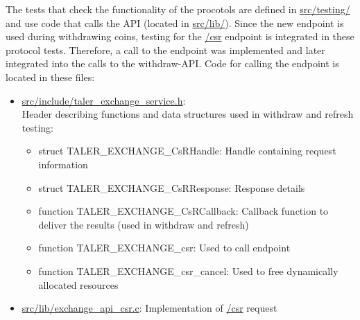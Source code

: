 The tests that check the functionality of the procotols are defined in \url{src/testing/} and use code that calls the \ac{API} (located in \url{src/lib/}).
Since the new endpoint is used during withdrawing coins, testing for the \url{/csr} endpoint is integrated in these protocol tests.
Therefore, a call to the endpoint was implemented and later integrated into the calls to the withdraw-\ac{API}.
Code for calling the endpoint is located in these files:
\begin{itemize}
    \item \url{src/include/taler_exchange_service.h}: \\
    Header describing functions and data structures used in withdraw and refresh testing:
    \begin{itemize}
        \item struct TALER\_EXCHANGE\_CsRHandle: Handle containing request information
        \item struct TALER\_EXCHANGE\_CsRResponse: Response details
        \item function TALER\_EXCHANGE\_CsRCallback: Callback function to deliver the results (used in withdraw and refresh)
        \item function TALER\_EXCHANGE\_csr: Used to call endpoint
        \item function TALER\_EXCHANGE\_csr\_cancel: Used to free dynamically allocated resources
    \end{itemize}
    \item \url{src/lib/exchange_api_csr.c}: Implementation of \url{/csr} request
\end{itemize}


